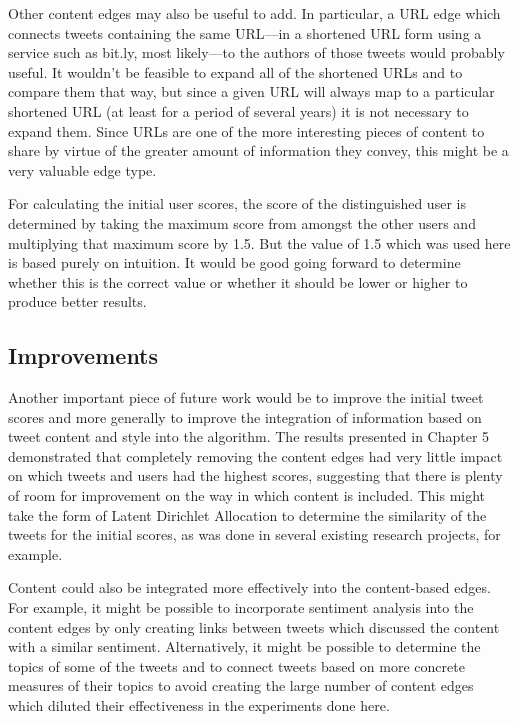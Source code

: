 Other content edges may also be useful to add. In particular, a URL edge which connects tweets containing the same URL---in a shortened URL form using a service such as bit.ly, most likely---to the authors of those tweets would probably useful. It wouldn't be feasible to expand all of the shortened URLs and to compare them that way, but since a given URL will always map to a particular shortened URL (at least for a period of several years) it is not necessary to expand them. Since URLs are one of the more interesting pieces of content to share by virtue of the greater amount of information they convey, this might be a very valuable edge type.

For calculating the initial user scores, the score of the distinguished user is determined by taking the maximum score from amongst the other users and multiplying that maximum score by 1.5. But the value of 1.5 which was used here is based purely on intuition. It would be good going forward to determine whether this is the correct value or whether it should be lower or higher to produce better results.

\subsection{Improvements}

Another important piece of future work would be to improve the initial tweet scores and more generally to improve the integration of information based on tweet content and style into the algorithm. The results presented in Chapter 5 demonstrated that completely removing the content edges had very little impact on which tweets and users had the highest scores, suggesting that there is plenty of room for improvement on the way in which content is included. This might take the form of Latent Dirichlet Allocation to determine the similarity of the tweets for the initial scores, as was done in several existing research projects, for example.

Content could also be integrated more effectively into the content-based edges. For example, it might be possible to incorporate sentiment analysis into the content edges by only creating links between tweets which discussed the content with a similar sentiment. Alternatively, it might be possible to determine the topics of some of the tweets and to connect tweets based on more concrete measures of their topics to avoid creating the large number of content edges which diluted their effectiveness in the experiments done here.

